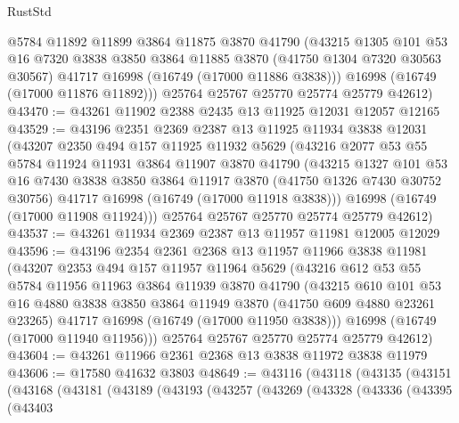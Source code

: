 \begin{lexlean}{RustStd}
\begin{coremodule}
        @5784
        @11892
        @11899
        @3864
        @11875
        @3870
        @41790
        (@43215
          @1305
          @101
          @53
          @16
          @7320
          @3838
          @3850
          @3864
          @11885
          @3870
          (@41750 @1304 @7320 @30563 @30567)
          @41717
          @16998
          (@16749 (@17000 @11886 @3838)))
        @16998
        (@16749 (@17000 @11876 @11892)))
      @25764
      @25767
      @25770
      @25774
      @25779
      @42612)
@43470 := @43261 @11902 @2388 @2435 @13 @11925 @12031 @12057 @12165
@43529 := @43196
    @2351
    @2369
    @2387
    @13
    @11925
    @11934
    @3838
    @12031
    (@43207
      @2350
      @494
      @157
      @11925
      @11932
      @5629
      (@43216
        @2077
        @53
        @55
        @5784
        @11924
        @11931
        @3864
        @11907
        @3870
        @41790
        (@43215
          @1327
          @101
          @53
          @16
          @7430
          @3838
          @3850
          @3864
          @11917
          @3870
          (@41750 @1326 @7430 @30752 @30756)
          @41717
          @16998
          (@16749 (@17000 @11918 @3838)))
        @16998
        (@16749 (@17000 @11908 @11924)))
      @25764
      @25767
      @25770
      @25774
      @25779
      @42612)
@43537 := @43261 @11934 @2369 @2387 @13 @11957 @11981 @12005 @12029
@43596 := @43196
    @2354
    @2361
    @2368
    @13
    @11957
    @11966
    @3838
    @11981
    (@43207
      @2353
      @494
      @157
      @11957
      @11964
      @5629
      (@43216
        @612
        @53
        @55
        @5784
        @11956
        @11963
        @3864
        @11939
        @3870
        @41790
        (@43215
          @610
          @101
          @53
          @16
          @4880
          @3838
          @3850
          @3864
          @11949
          @3870
          (@41750 @609 @4880 @23261 @23265)
          @41717
          @16998
          (@16749 (@17000 @11950 @3838)))
        @16998
        (@16749 (@17000 @11940 @11956)))
      @25764
      @25767
      @25770
      @25774
      @25779
      @42612)
@43604 := @43261 @11966 @2361 @2368 @13 @3838 @11972 @3838 @11979
@43606 := @17580 @41632 @3803
@48649 := @43116
    (@43118
      (@43135
        (@43151
          (@43168
            (@43181
              (@43189
                (@43193
                  (@43257
                    (@43269
                      (@43328
                        (@43336
                          (@43395
                            (@43403

\end{coremodule}
\end{lexlean}
